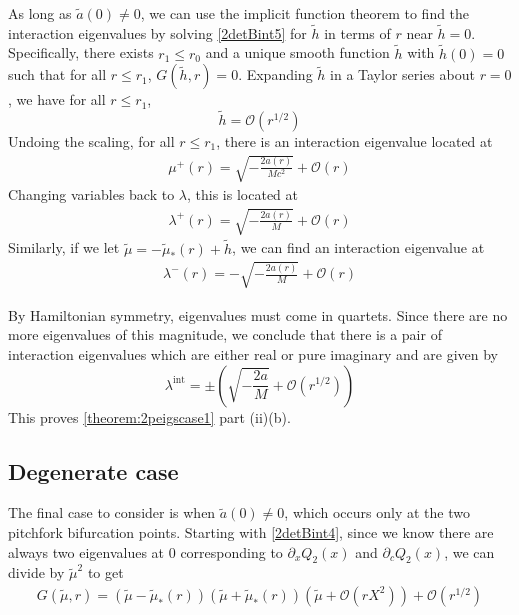 \documentclass[thesis.tex]{subfiles}
\begin{document}
As long as $\tilde{a}(0) \neq 0$, we can use the implicit function theorem to find the interaction eigenvalues by solving \cref{2detBint5} for $\tilde{h}$ in terms of $r$ near $\tilde{h} = 0$. Specifically, there exists $r_1 \leq r_0$ and a unique smooth function $\tilde{h}$ with $\tilde{h}(0) = 0$ such that for all $r \leq r_1$, $G(\tilde{h}, r) = 0$. Expanding $\tilde{h}$ in a Taylor series about $r = 0$, we have
for all $r \leq r_1$,
\[
\tilde{h} = \mathcal{O}( r^{1/2} )
\]
Undoing the scaling, for all $r \leq r_1$, there is an interaction eigenvalue located at
\begin{align*}
\mu^+(r) = \sqrt{-\frac{2 a(r)}{M c^2}} + \mathcal{O}(r)
\end{align*}
Changing variables back to $\lambda$, this is located at
\begin{align*}
\lambda^+(r) = \sqrt{-\frac{2 a(r)}{M}} + \mathcal{O}( r )
\end{align*}
Similarly, if we let $\tilde{\mu} = -\tilde{\mu}_*(r) + \tilde{h}$, we can find an interaction eigenvalue at
\begin{align*}
\lambda^-(r) = -\sqrt{-\frac{2 a(r)}{M}} + \mathcal{O}( r )
\end{align*}

By Hamiltonian symmetry, eigenvalues must come in quartets. Since there are no more eigenvalues of this magnitude, we conclude that there is a pair of interaction eigenvalues which are either real or pure imaginary and are given by
\[
\lambda^{\text{int}} = \pm \left( \sqrt{-\frac{2 a}{M}} + \mathcal{O}( r^{1/2} ) \right)
\]
This proves \cref{theorem:2peigscase1} part (ii)(b).

\subsection{Degenerate case}

The final case to consider is when $\tilde{a}(0) \neq 0$, which occurs only at the two pitchfork bifurcation points. Starting with \cref{2detBint4}, since we know there are always two eigenvalues at 0 corresponding to $\partial_x Q_2(x)$ and $\partial_c Q_2(x)$, we can divide by $\tilde{\mu}^2$ to get
\begin{equation}\label{2degen1}
\begin{aligned}
G(\tilde{\mu},r) = (\tilde{\mu} - \tilde{\mu}_*(r))(\tilde{\mu} + \tilde{\mu}_*(r))\left( \tilde{\mu} + \mathcal{O}(r X^2)\right) + \mathcal{O}( r^{1/2} )
\end{aligned}
\end{equation}
\end{document}
